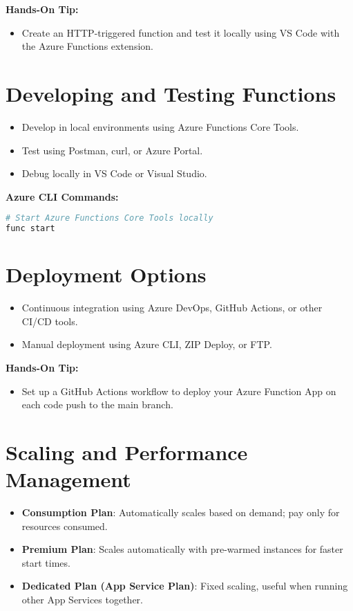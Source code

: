 \documentclass{article}
\begin{document}
\textbf{Hands-On Tip:}
\begin{itemize}
    \item Create an HTTP-triggered function and test it locally using VS Code with the Azure Functions extension.
\end{itemize}

\section{Developing and Testing Functions}
\begin{itemize}
    \item Develop in local environments using Azure Functions Core Tools.
    \item Test using Postman, curl, or Azure Portal.
    \item Debug locally in VS Code or Visual Studio.
\end{itemize}

\textbf{Azure CLI Commands:}
\begin{lstlisting}[language=bash]
# Start Azure Functions Core Tools locally
func start
\end{lstlisting}

\section{Deployment Options}
\begin{itemize}
    \item Continuous integration using Azure DevOps, GitHub Actions, or other CI/CD tools.
    \item Manual deployment using Azure CLI, ZIP Deploy, or FTP.
\end{itemize}

\textbf{Hands-On Tip:}
\begin{itemize}
    \item Set up a GitHub Actions workflow to deploy your Azure Function App on each code push to the main branch.
\end{itemize}

\section{Scaling and Performance Management}
\begin{itemize}
    \item \textbf{Consumption Plan}: Automatically scales based on demand; pay only for resources consumed.
    \item \textbf{Premium Plan}: Scales automatically with pre-warmed instances for faster start times.
    \item \textbf{Dedicated Plan (App Service Plan)}: Fixed scaling, useful when running other App Services together.
\end{itemize}
\end{document}
